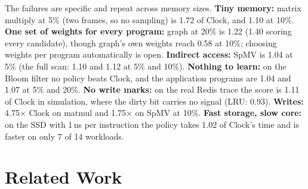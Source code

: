 \documentclass{article}
\newcommand{\clock}{Clock\xspace}
\begin{document}
The failures are specific and repeat across memory sizes.
\textbf{Tiny memory:} matrix multiply at 5\% (two frames, so no sampling) is 1.72 of
\clock, and 1.10 at 10\%. \textbf{One set of weights for every program:} graph at 20\% is
1.22 (1.40 scoring every candidate), though graph's own weights reach 0.58 at 10\%;
choosing weights per program automatically is open. \textbf{Indirect access:} SpMV is 1.04
at 5\% (the full scan: 1.10 and 1.12 at 5\% and 10\%). \textbf{Nothing to learn:} on the
Bloom filter no policy beats \clock, and the application programs are 1.04 and 1.07 at 5\%
and 20\%. \textbf{No write marks:} on the real Redis trace the score is 1.11 of \clock in
simulation, where the dirty bit carries no signal (LRU: 0.93). \textbf{Writes:}
4.75$\times$ \clock on matmul and 1.75$\times$ on SpMV at 10\%. \textbf{Fast storage, slow
core:} on the SSD with 1\,ns per instruction the policy takes 1.02 of \clock's time and is
faster on only 7 of 14 workloads.
\section{Related Work}
\label{sec:related}
\end{document}
